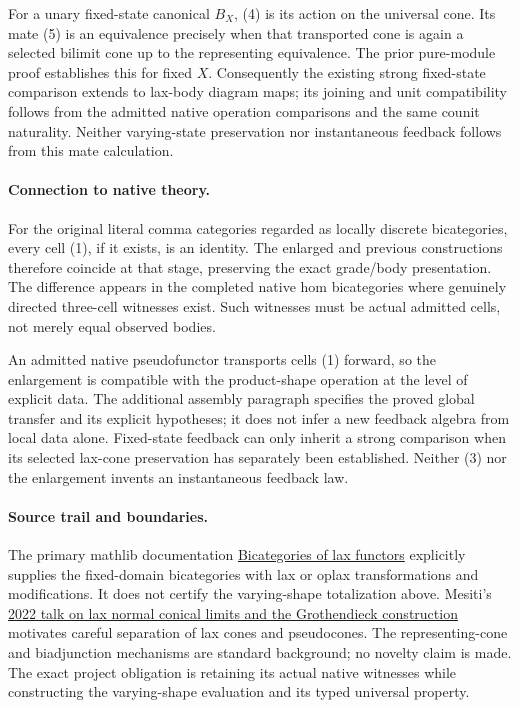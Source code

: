 \documentclass{article}
\begin{document}
For a unary fixed-state canonical $B_X$, (4) is its action on the universal cone. Its mate (5) is an equivalence precisely when that transported cone is again a selected bilimit cone up to the representing equivalence. The prior pure-module proof establishes this for fixed $X$. Consequently the existing strong fixed-state comparison extends to lax-body diagram maps; its joining and unit compatibility follows from the admitted native operation comparisons and the same counit naturality. Neither varying-state preservation nor instantaneous feedback follows from this mate calculation.

\paragraph{Connection to native theory.} For the original literal comma categories regarded as locally discrete bicategories, every cell (1), if it exists, is an identity. The enlarged and previous constructions therefore coincide at that stage, preserving the exact grade/body presentation. The difference appears in the completed native hom bicategories where genuinely directed three-cell witnesses exist. Such witnesses must be actual admitted cells, not merely equal observed bodies.

An admitted native pseudofunctor transports cells (1) forward, so the enlargement is compatible with the product-shape operation at the level of explicit data. The additional assembly paragraph specifies the proved global transfer and its explicit hypotheses; it does not infer a new feedback algebra from local data alone. Fixed-state feedback can only inherit a strong comparison when its selected lax-cone preservation has separately been established. Neither (3) nor the enlargement invents an instantaneous feedback law.

\paragraph{Source trail and boundaries.} The primary mathlib documentation \href{https://leanprover-community.github.io/mathlib4_docs/Mathlib/CategoryTheory/Bicategory/FunctorBicategory/Lax.html}{Bicategories of lax functors} explicitly supplies the fixed-domain bicategories with lax or oplax transformations and modifications. It does not certify the varying-shape totalization above. Mesiti's \href{https://lucamesiti.github.io/files/Talk-2022-12-15-Yamcats_Laxnlimitsgrothconstr.pdf}{2022 talk on lax normal conical limits and the Grothendieck construction} motivates careful separation of lax cones and pseudocones. The representing-cone and biadjunction mechanisms are standard background; no novelty claim is made. The exact project obligation is retaining its actual native witnesses while constructing the varying-shape evaluation and its typed universal property.
\end{document}
